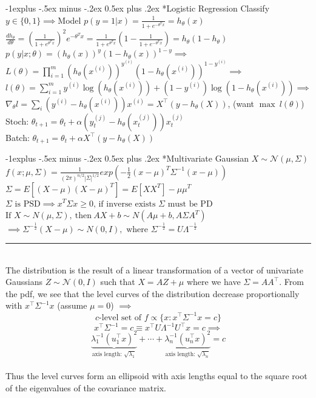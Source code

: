 \documentclass[3pt,landscape]{article}
\makeatletter
\renewcommand{\subsection}{\@startsection{subsection}{2}{0mm}%
                            {-1explus -.5ex minus -.2ex}%
                            {0.5ex plus .2ex}%
                            {\normalfont\normalsize\bfseries}}
\makeatother
\begin{document}
\begin{multicols}{3}
\subsection*{Logistic Regression}
Classify $y \in \{0,1\} \implies$Model $p(y=1|x) = \frac{1}{1+e^{-\theta^T x}}= h_\theta(x)$\\
$\frac{dh_\theta}{d\theta} = (\frac{1}{1 + e^{\theta^Tx}})^2 e^{-\theta^Tx} = \frac{1}{1 + e^{\theta^Tx}}\left(1-\frac{1}{1+e^{-\theta^Tx}}\right) = h_\theta(1-h_\theta)$
\(p(y|x;\theta) = (h_\theta(x))^y(1-h_\theta(x))^{1-y} \implies\)
\(L(\theta)  = \prod_{i=1}^m (h_\theta(x^{(i)}))^{y^{(i)}}(1-h_\theta(x^{(i)}))^{1-y^{(i)}} \implies \)
\(l(\theta) = \sum_{i=1}^m y^{(i)} \log(h_\theta(x^{(i)})) + (1-y^{(i)})\log(1-h_\theta(x^{(i)})) \implies\)
\(\nabla_\theta l = \sum_i (y^{(i)} - h_\theta(x^{(i)}))x^{(i)} = X^\intercal (y-h_\theta(X))\),  (want $\max \ l(\theta)$)
Stoch: $\boxed{\theta_{t+1} = \theta_t + \alpha(y^{(j)}_t - h_\theta(x^{(j)}_t))x^{(j)}_t}$\\
Batch: $\boxed{\theta_{t+1} = \theta_t + \alpha X^\intercal(y-h_\theta(X))}$

\subsection*{Multivariate Gaussian $X \sim \mathcal{N}(\mu,\Sigma)$}
\(f(x;\mu,\Sigma)=\frac{1}{(2\pi)^{n/2}|\Sigma|^{1/2}}exp\left(-\frac{1}{2}(x-\mu)^T \Sigma^{-1}(x-\mu)\right)\)
\(\Sigma=E[(X-\mu)(X-\mu)^T]=E[XX^T]-\mu\mu^T\)
\(\Sigma \text{ is PSD} \implies x^T\Sigma x \ge 0 \text{, if inverse exists }\Sigma \text{ must be PD}\)
\(\text{If } X\sim N(\mu,\Sigma),\ \text{then}\ AX+b\sim N(A\mu+b,A\Sigma A^T)\)\\
\(\implies \Sigma^{-\frac{1}{2}}(X-\mu)\sim N(0,I), \text{ where } \Sigma^{-\frac{1}{2}}=U\Lambda^{-\frac{1}{2}}\)\\
\rule{1\linewidth}{0.1pt}\\
The distribution is the result of a linear transformation of a vector of univariate Gaussians $Z \sim \mathcal{N}(0,I)$ such that $X = AZ + \mu$ where we have $\Sigma = AA^\intercal$. From the pdf, we see that the level curves of the distribution decrease proportionally with $x^\intercal\Sigma^{-1}x$ (assume $\mu = 0$) $\implies$ \[\text{$c$-level set of $f$} \propto \{x:x^\intercal\Sigma^{-1}x = c\}\]
\[x^\intercal\Sigma^{-1} = c \equiv x^\intercal U\Lambda^{-1}U^\intercal x = c \implies\]
\[\underbrace{\lambda_1^{-1}(u_1^\intercal x)^2}_\text{axis length: $\sqrt{\lambda_1}$} + \cdots +\underbrace{\lambda_n^{-1}(u_n^\intercal x)^2}_\text{axis length: $\sqrt{\lambda_n}$} = c\]\\
Thus the level curves form an ellipsoid with axis lengths equal to the square root of the eigenvalues of the covariance matrix.


\end{multicols}
\end{document}
